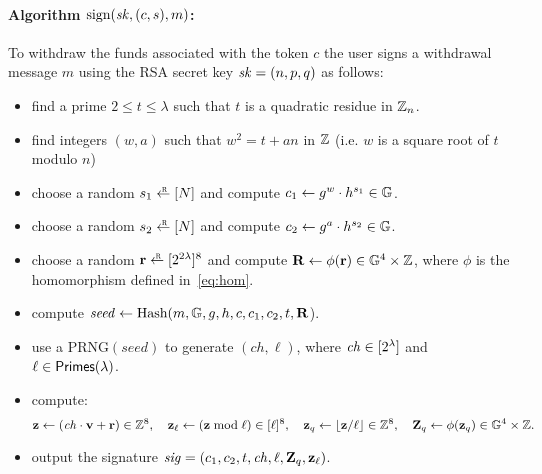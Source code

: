 \documentclass[11pt]{article}
\begin{document}
\paragraph{Algorithm $\text{sign}(\mathit{sk}, (c, s), m)$:}  
To withdraw the funds associated with the token $c$ the user
signs a withdrawal message $m$ using the RSA secret key $\mathit{sk} = (n,p,q)$ 
as follows:
\begin{itemize}
\item find a prime $2 \leq t \leq \lambda$  such that $t$ is a quadratic 
residue in $\mathbb Z_n$. 

\item find integers $(w,a)$ such that $w^2 = t + a n$ in $\mathbb Z$
           (i.e. $w$ is a square root of $t$ modulo $n$)

\item choose a random $s_1 \rgets \range{N}$ and compute
           $c_1 \gets g^w \cdot h^{s_1} \in \mathbb G$.

\item choose a random $s_2 \rgets \range{N}$ and compute
           $c_2 \gets g^a \cdot h^{s_2} \in \mathbb G$.

\item choose a random $\rv \rgets \range{2^{2\lambda}}^8$
and compute $\mathbf{R} \gets \phi(\mathbf{r}) \in \mathbb G^4 \times \mathbb Z$,
where $\phi$ is the homomorphism defined in~\eqref{eq:hom}. 

\item compute $\mathit{seed} \gets \text{Hash}(m, \mathbb G, g, h, c, c_1, c_2, t, \mathbf{R}$).

\item
use a $\text{PRNG}(\mathit{seed})$ to generate $(\mathit{ch}, \ell)$, 
where $\mathit{ch} \in [{2^\lambda}]$ and $\ell \in \textsf{Primes}(\lambda)$.

\item compute:
\[  \mathbf{z} \gets (\mathit{ch} \cdot \mathbf{v} + \mathbf{r}) \in \mathbb Z^8, \quad
    \mathbf{z}_\ell \gets (\mathbf{z} \bmod \ell) \in [{\ell}]^8, \quad
    \mathbf{z}_q \gets \lfloor \mathbf{z} / \ell \rfloor \in \mathbb Z^8, \quad
    \mathbf{Z}_q \gets \phi(\mathbf{z}_q) \in \mathbb G^4 \times \mathbb Z.
\]

\item output the signature 
$\mathit{sig} = (c_1, c_2, t, \mathit{ch}, \ell, \mathbf{Z}_q, \mathbf{z}_\ell)$.
\end{itemize}
\end{document}

